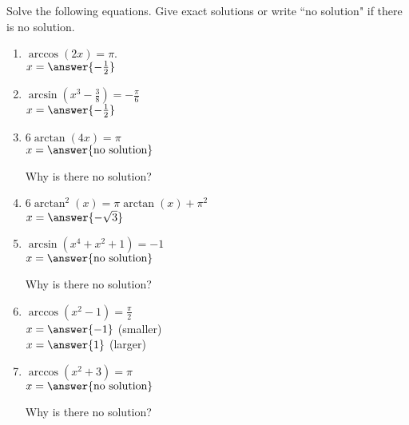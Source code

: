 \documentclass{ximera}
\author{Elizabeth Campolongo}
\begin{document}
\begin{exercise}
Solve the following equations. Give exact solutions or write ``no solution" if there is no solution. 
%
\begin{enumerate}

\item $\arccos(2x) = \pi.$\\
$x = \answer{-\frac{1}{2}}$

\item $\arcsin(x^3 - \frac{3}{8}) = -\frac{\pi}{6}$\\
$x = \answer{-\frac{1}{2}}$

\item $6\arctan(4x) = \pi$\\
$x = \answer{\text{no solution}}$
\begin{exercise}
Why is there no solution?
\begin{multipleChoice}
\end{multipleChoice}
\end{exercise}

\item $6\arctan^2(x)=\pi \arctan(x) + \pi^2$\\
$x = \answer{-\sqrt{3}}$

\item $\arcsin(x^4+x^2+1) = -1$ \\
$x = \answer{\text{no solution}}$
\begin{exercise}
Why is there no solution?
\begin{multipleChoice}
\end{multipleChoice}
\end{exercise}

\item $\arccos(x^2-1) = \frac{\pi}{2}$ \\
$x = \answer{-1}$ (smaller)\\
$x = \answer{1}$ (larger)

\item $\arccos(x^2+3) = \pi$ \\
$x = \answer{\text{no solution}}$
\begin{exercise}
Why is there no solution?
\begin{multipleChoice}
\end{multipleChoice}
\end{exercise}

\end{enumerate}

\end{exercise}
\end{document}
